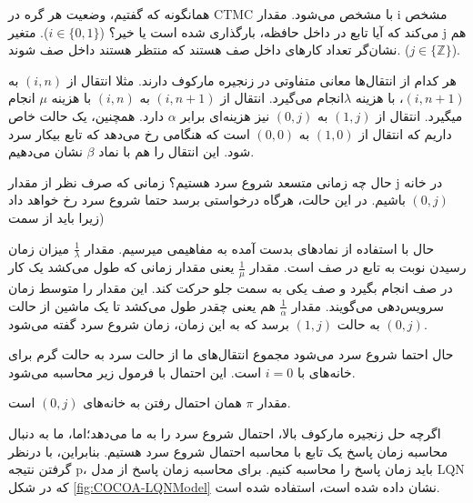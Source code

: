 همانگونه که گفتیم، وضعیت هر گره در CTMC با  مشخص می‌شود. مقدار i مشخص می‌کند که آیا تابع در داخل حافظه، بارگذاری شده است یا خیر؟‌ ($i \in \{0, 1\}$). متغیر j هم نشان‌گر تعداد کارهای داخل صف هستند که منتظر هستند داخل صف شوند. ($j \in \{ \mathbb{Z} \}$). 

هر کدام از انتقال‌ها معانی متفاوتی در زنجیره مارکوف دارند. مثلا انتقال از $(i, n)$ به $(i, n+1)$، با هزینه $\lambda$انجام می‌گیرد. انتقال از $(i, n+1)$ به $(i, n)$ با هزینه $\mu$ انجام‌ میگیرد. انتقال از $(1, j)$ به $(0, j)$ نیز هزینه‌ای برابر $\alpha$ دارد. همچنین، یک حالت خاص داریم که انتقال از $(1, 0)$ به $(0, 0)$ است که هنگامی رخ می‌دهد که تابع بیکار سرد شود. این انتقال را هم با نماد $\beta$ نشان می‌دهیم. 

حال چه زمانی متسعد شروع سرد هستیم؟ زمانی که صرف نظر از مقدار j در خانه $(0 , j)$ باشیم. در این حالت، هرگاه درخواستی برسد حتما شروع سرد رخ خواهد داد زیرا باید از سمت)

حال با استفاده از نماد‌های بدست آمده به مفاهیمی میرسیم. مقدار $\frac{1}{\lambda}$ میزان زمان رسیدن نوبت به تابع در صف است. مقدار $\frac{1}{\mu}$ یعنی مقدار زمانی که طول می‌کشد یک کار در صف انجام بگیرد و صف یکی به سمت جلو حرکت کند. این مقدار را متوسط زمان سرویس‌دهی می‌گویند. مقدار $\frac{1}{\alpha}$ هم یعنی چقدر طول می‌کشد تا یک ماشین از حالت $(0, j)$ به حالت $(1, j)$ برسد که به این زمان، زمان شروع سرد گفته می‌شود. 

حال احتما شروع سرد می‌شود مجموع انتقال‌های ما از حالت سرد به حالت گرم برای خانه‌های با $ i=0$ است. این احتمال با فرمول زیر محاسبه می‌شود. 

\label{formula:ColdStartProbability}
\RTL
مقدار $\pi$ همان احتمال رفتن به خانه‌های $(0, j)$ است. 

اگرچه حل زنجیره مارکوف بالا، احتمال شروع سرد را به ما می‌دهد؛‌اما، ما به دنبال محاسبه زمان پاسخ یک تابع با محاسبه احتمال شروع سرد هستیم. بنابراین، با درنظر گرفتن نتیجه p، باید زمان پاسخ را محاسبه کنیم. برای محاسبه زمان پاسخ از مدل LQN که در شکل \ref{fig:COCOA-LQNModel} نشان داده شده است، استفاده شده است. 

